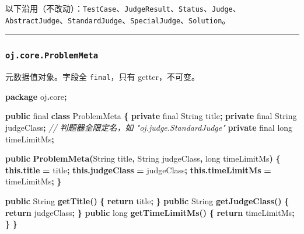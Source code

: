 \documentclass[
  11pt,
]{ctexart}
\newenvironment{Shaded}{\begin{snugshade}}{\end{snugshade}}
\newcommand{\BuiltInTok}[1]{#1}
\newcommand{\CommentTok}[1]{\textcolor[rgb]{0.56,0.35,0.01}{\textit{#1}}}
\newcommand{\ControlFlowTok}[1]{\textcolor[rgb]{0.13,0.29,0.53}{\textbf{#1}}}
\newcommand{\DataTypeTok}[1]{\textcolor[rgb]{0.13,0.29,0.53}{#1}}
\newcommand{\FunctionTok}[1]{\textcolor[rgb]{0.13,0.29,0.53}{\textbf{#1}}}
\newcommand{\ImportTok}[1]{#1}
\newcommand{\KeywordTok}[1]{\textcolor[rgb]{0.13,0.29,0.53}{\textbf{#1}}}
\newcommand{\NormalTok}[1]{#1}
\newcommand{\OperatorTok}[1]{\textcolor[rgb]{0.81,0.36,0.00}{\textbf{#1}}}
\begin{document}
以下沿用（不改动）：\texttt{TestCase}、\texttt{JudgeResult}、\texttt{Status}、\texttt{Judge}、\texttt{AbstractJudge}、\texttt{StandardJudge}、\texttt{SpecialJudge}、\texttt{Solution}。

\begin{center}\rule{0.5\linewidth}{0.5pt}\end{center}

\hypertarget{oj.core.problemmeta}{%
\subsubsection{\texorpdfstring{\texttt{oj.core.ProblemMeta}}{oj.core.ProblemMeta}}\label{oj.core.problemmeta}}

元数据值对象。字段全 \texttt{final}，只有 getter，不可变。

\begin{Shaded}
\begin{Highlighting}[]
\KeywordTok{package}\ImportTok{ oj}\OperatorTok{.}\ImportTok{core}\OperatorTok{;}

\KeywordTok{public} \DataTypeTok{final} \KeywordTok{class}\NormalTok{ ProblemMeta }\OperatorTok{\{}
    \KeywordTok{private} \DataTypeTok{final} \BuiltInTok{String}\NormalTok{ title}\OperatorTok{;}
    \KeywordTok{private} \DataTypeTok{final} \BuiltInTok{String}\NormalTok{ judgeClass}\OperatorTok{;}   \CommentTok{// 判题器全限定名，如 "oj.judge.StandardJudge"}
    \KeywordTok{private} \DataTypeTok{final} \DataTypeTok{long}\NormalTok{ timeLimitMs}\OperatorTok{;}

    \KeywordTok{public} \FunctionTok{ProblemMeta}\OperatorTok{(}\BuiltInTok{String}\NormalTok{ title}\OperatorTok{,} \BuiltInTok{String}\NormalTok{ judgeClass}\OperatorTok{,} \DataTypeTok{long}\NormalTok{ timeLimitMs}\OperatorTok{)} \OperatorTok{\{}
        \KeywordTok{this}\OperatorTok{.}\FunctionTok{title} \OperatorTok{=}\NormalTok{ title}\OperatorTok{;}
        \KeywordTok{this}\OperatorTok{.}\FunctionTok{judgeClass} \OperatorTok{=}\NormalTok{ judgeClass}\OperatorTok{;}
        \KeywordTok{this}\OperatorTok{.}\FunctionTok{timeLimitMs} \OperatorTok{=}\NormalTok{ timeLimitMs}\OperatorTok{;}
    \OperatorTok{\}}

    \KeywordTok{public} \BuiltInTok{String} \FunctionTok{getTitle}\OperatorTok{()} \OperatorTok{\{} \ControlFlowTok{return}\NormalTok{ title}\OperatorTok{;} \OperatorTok{\}}
    \KeywordTok{public} \BuiltInTok{String} \FunctionTok{getJudgeClass}\OperatorTok{()} \OperatorTok{\{} \ControlFlowTok{return}\NormalTok{ judgeClass}\OperatorTok{;} \OperatorTok{\}}
    \KeywordTok{public} \DataTypeTok{long} \FunctionTok{getTimeLimitMs}\OperatorTok{()} \OperatorTok{\{} \ControlFlowTok{return}\NormalTok{ timeLimitMs}\OperatorTok{;} \OperatorTok{\}}
\OperatorTok{\}}
\end{Highlighting}
\end{Shaded}
\end{document}
